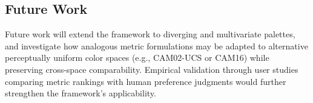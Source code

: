 \subsection{Future Work}

Future work will extend the framework to diverging and
multivariate palettes, and investigate how analogous metric formulations may
be adapted to alternative perceptually uniform color spaces (e.g., CAM02-UCS
or CAM16) while preserving cross-space comparability.
Empirical validation through user studies comparing metric rankings with
human preference judgments would further strengthen the framework's
applicability.
